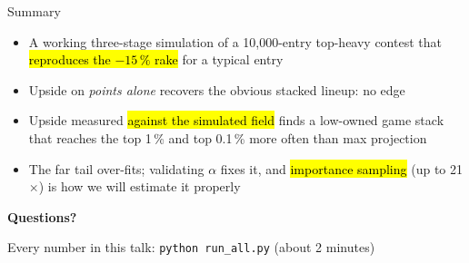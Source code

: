 \begin{frame}{Summary}
  \begin{itemize}
    \setlength\itemsep{0.9em}
    \item A working three-stage simulation of a 10{,}000-entry top-heavy contest that
      \hl{reproduces the $-15\,\%$ rake} for a typical entry
    \item Upside on \emph{points alone} recovers the obvious stacked lineup: no edge
    \item Upside measured \hl{against the simulated field} finds a low-owned game stack that
      reaches the top 1\,\% and top 0.1\,\% more often than max projection
    \item The far tail over-fits; validating $\alpha$ fixes it, and \hl{importance
      sampling} (up to 21$\times$) is how we will estimate it properly
  \end{itemize}
\end{frame}

\begin{frame}[plain]
  \centering\vfill
  {\Huge\bfseries\color{navy} Questions?}\par\vspace{1.5em}
  \small Every number in this talk: \texttt{python run\_all.py} (about 2 minutes)
  \vfill
\end{frame}


